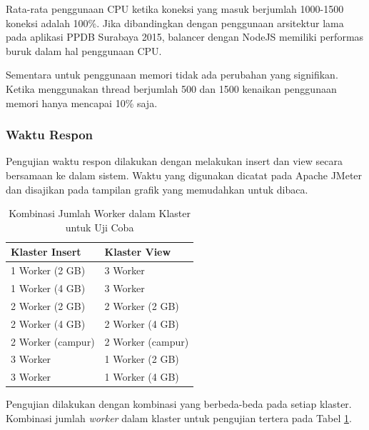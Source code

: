 \documentclass{ta-its}
\begin{document}
					Rata-rata penggunaan CPU ketika koneksi yang masuk berjumlah 1000-1500 koneksi adalah 100\%. Jika dibandingkan dengan penggunaan arsitektur lama pada aplikasi PPDB Surabaya 2015, balancer dengan NodeJS memiliki performas buruk dalam hal penggunaan CPU. 
					
					Sementara untuk penggunaan memori tidak ada perubahan yang signifikan. Ketika menggunakan thread berjumlah 500 dan 1500 kenaikan penggunaan memori hanya mencapai 10\% saja.
				
				\subsubsection{Waktu Respon}
					Pengujian waktu respon dilakukan dengan melakukan insert dan view secara bersamaan ke dalam sistem. Waktu yang digunakan dicatat pada Apache JMeter dan disajikan pada tampilan grafik yang memudahkan untuk dibaca. 
					
					\begin{longtable}{|p{0.3\textwidth}|p{}|} %
						
						\caption{Kombinasi Jumlah Worker dalam Klaster untuk Uji Coba} \label{tabelKombinasi} \\
						\hline
						\textbf{Klaster Insert} & \textbf{Klaster View} \\ \hline
						
						\endhead
						\endfoot
						\endlastfoot
						
						1 Worker (2 GB) & 3 Worker \\ \hline
						1 Worker (4 GB) & 3 Worker \\ \hline
						2 Worker (2 GB) & 2 Worker (2 GB) \\ \hline
						2 Worker (4 GB) & 2 Worker (4 GB) \\ \hline
						2 Worker (campur) & 2 Worker (campur) \\ \hline
						3 Worker & 1 Worker (2 GB) \\ \hline
						3 Worker & 1 Worker (4 GB) \\ \hline
						
						
					\end{longtable}
					
					Pengujian dilakukan dengan kombinasi yang berbeda-beda pada setiap klaster. Kombinasi jumlah \textit{worker} dalam klaster untuk pengujian tertera pada Tabel \ref{tabelKombinasi}.
					
\end{document}
